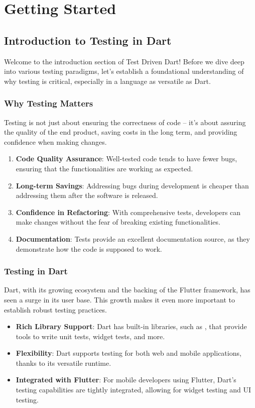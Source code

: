 \section{Getting Started}\label{getting-started}

\subsection{Introduction to Testing in Dart}

Welcome to the introduction section of Test Driven Dart! Before we dive deep into various testing paradigms, let's establish a foundational understanding of why testing is critical, especially in a language as versatile as Dart.

\subsubsection*{Why Testing Matters}

Testing is not just about ensuring the correctness of code – it's about assuring the quality of the end product, saving costs in the long term, and providing confidence when making changes.

\begin{enumerate}
    \item \textbf{Code Quality Assurance}: Well-tested code tends to have fewer bugs, ensuring that the functionalities are working as expected.
    \item \textbf{Long-term Savings}: Addressing bugs during development is cheaper than addressing them after the software is released.
    \item \textbf{Confidence in Refactoring}: With comprehensive tests, developers can make changes without the fear of breaking existing functionalities.
    \item \textbf{Documentation}: Tests provide an excellent documentation source, as they demonstrate how the code is supposed to work.
\end{enumerate}

\subsubsection*{Testing in Dart}

Dart, with its growing ecosystem and the backing of the Flutter framework, has seen a surge in its user base.
This growth makes it even more important to establish robust testing practices.

\begin{itemize}
    \item \textbf{Rich Library Support}: Dart has built-in libraries, such as , that provide tools to write unit tests, widget tests, and more.
    \item \textbf{Flexibility}: Dart supports testing for both web and mobile applications, thanks to its versatile runtime.
    \item \textbf{Integrated with Flutter}: For mobile developers using Flutter, Dart's testing capabilities are tightly integrated, allowing for widget testing and UI testing.
\end{itemize}


